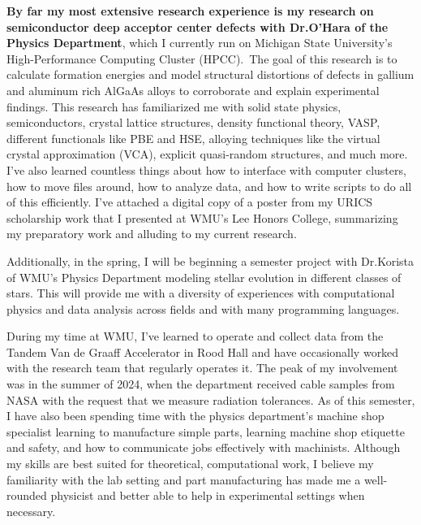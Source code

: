 \documentclass[11pt]{article}
\begin{document}
\textbf{By far my most extensive research experience is my research on semiconductor deep acceptor center defects with Dr.\@ O'Hara of the Physics Department}, which I currently run on Michigan State University's High-Performance Computing Cluster (HPCC).\ The goal of this research is to calculate formation energies and model structural distortions of defects in gallium and aluminum rich AlGaAs alloys to corroborate and explain experimental findings. This research has familiarized me with solid state physics, semiconductors, crystal lattice structures, density functional theory, VASP, different functionals like PBE and HSE, alloying techniques like the virtual crystal approximation (VCA), explicit quasi-random structures, and much more. I've also learned countless things about how to interface with computer clusters, how to move files around, how to analyze data, and how to write scripts to do all of this efficiently. I've attached a digital copy of a poster from my URICS scholarship work that I presented at WMU's Lee Honors College, summarizing my preparatory work and alluding to my current research.
\pagebreak

Additionally, in the spring, I will be beginning a semester project with Dr.\@ Korista of WMU's Physics Department modeling stellar evolution in different classes of stars. This will provide me with a diversity of experiences with computational physics and data analysis across fields and with many programming languages.

During my time at WMU, I've learned to operate and collect data from the Tandem Van de Graaff Accelerator in Rood Hall and have occasionally worked with the research team that regularly operates it. The peak of my involvement was in the summer of 2024, when the department received cable samples from NASA with the request that we measure radiation tolerances. As of this semester, I have also been spending time with the physics department's machine shop specialist learning to manufacture simple parts, learning machine shop etiquette and safety, and how to communicate jobs effectively with machinists. Although my skills are best suited for theoretical, computational work, I believe my familiarity with the lab setting and part manufacturing has made me a well-rounded physicist and better able to help in experimental settings when necessary.
\end{document}
